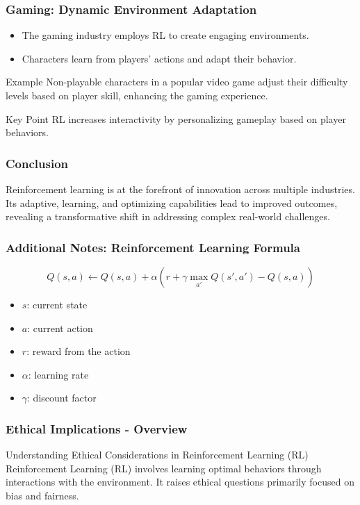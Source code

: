 \documentclass{beamer}
\begin{document}
\begin{frame}[fragile]
    \frametitle{Gaming: Dynamic Environment Adaptation}
    \begin{itemize}
        \item The gaming industry employs RL to create engaging environments.
        \item Characters learn from players' actions and adapt their behavior.
    \end{itemize}
    \begin{block}{Example}
        Non-playable characters in a popular video game adjust their difficulty levels based on player skill, enhancing the gaming experience.
    \end{block}
    \begin{block}{Key Point}
        RL increases interactivity by personalizing gameplay based on player behaviors.
    \end{block}
\end{frame}

\begin{frame}[fragile]
    \frametitle{Conclusion}
    Reinforcement learning is at the forefront of innovation across multiple industries. Its adaptive, learning, and optimizing capabilities lead to improved outcomes, revealing a transformative shift in addressing complex real-world challenges.
\end{frame}

\begin{frame}[fragile]
    \frametitle{Additional Notes: Reinforcement Learning Formula}
    \begin{equation}
        Q(s, a) \leftarrow Q(s, a) + \alpha \left( r + \gamma \max_{a'} Q(s', a') - Q(s, a) \right)
    \end{equation}
    \begin{itemize}
        \item $s$: current state
        \item $a$: current action
        \item $r$: reward from the action
        \item $\alpha$: learning rate
        \item $\gamma$: discount factor
    \end{itemize}
\end{frame}

\begin{frame}[fragile]
    \frametitle{Ethical Implications - Overview}
    \begin{block}{Understanding Ethical Considerations in Reinforcement Learning (RL)}
        Reinforcement Learning (RL) involves learning optimal behaviors through interactions with the environment. It raises ethical questions primarily focused on bias and fairness.
    \end{block}
\end{frame}
\end{document}
